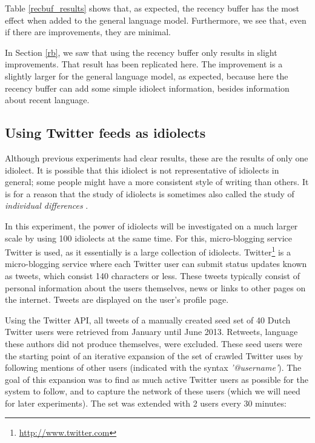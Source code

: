 \documentclass[11pt]{article}
\begin{document}
Table \ref{recbuf_results} shows that, as expected, the recency buffer has the most effect when added to the general language model. Furthermore, we see that, even if there are improvements, they are minimal.

In Section \ref{rb}, we saw that using the recency buffer only results in slight improvements. That result has been replicated here. The improvement is a slightly larger for the general language model, as expected, because here the recency buffer can add some simple idiolect information, besides information about recent language.

\subsection{Using Twitter feeds as idiolects} \label{twitter_idiolects}

Although previous experiments had clear results, these are the results of only one idiolect. It is possible that this idiolect is not representative of idiolects in general; some people might have a more consistent style of writing than others. It is for a reason that the study of idiolects is sometimes also called the study of \emph{individual differences} \cite{barlow10}. 

In this experiment, the power of idiolects will be investigated on a much larger scale by using 100 idiolects at the same time. For this, micro-blogging service Twitter is used, as it essentially is a large collection of idiolects. Twitter\footnote{\url{http://www.twitter.com}} is a micro-blogging service where each Twitter user can submit status updates known as tweets, which consist 140 characters or less. These tweets typically consist of personal information about the users themselves, news or links to other pages on the internet. Tweets are displayed on the user's profile page. 

Using the Twitter API, all tweets of a manually created seed set of 40 Dutch Twitter users were retrieved from January until June 2013. Retweets, language these authors did not produce themselves, were excluded. These seed users were the starting point of an iterative expansion of the set of crawled Twitter uses by following mentions of other users (indicated with the syntax \emph{'@username'}). The goal of this expansion was to find as much active Twitter users as possible for the system to follow, and to capture the network of these users (which we will need for later experiments). The set was extended with 2 users every 30 minutes:
\end{document}
